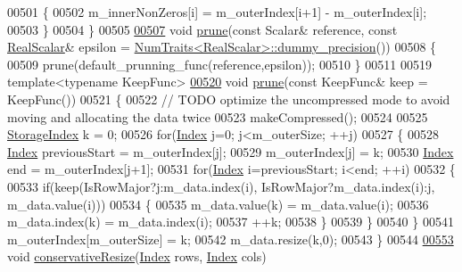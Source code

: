 \begin{DoxyCode}
00501       \{
00502         m\_innerNonZeros[i] = m\_outerIndex[i+1] - m\_outerIndex[i]; 
00503       \}
00504     \}
00505     
\hyperlink{group___sparse_core___module_a08af03b2fc6c371c8be4fcd62509288c}{00507}     \textcolor{keywordtype}{void} \hyperlink{group___sparse_core___module_a08af03b2fc6c371c8be4fcd62509288c}{prune}(\textcolor{keyword}{const} Scalar& reference, \textcolor{keyword}{const} \hyperlink{group___sparse_core___module_aaec8ace6efb785c81d442931c3248d88}{RealScalar}& epsilon = 
      \hyperlink{group___core___module_struct_eigen_1_1_num_traits}{NumTraits<RealScalar>::dummy\_precision}())
00508     \{
00509       prune(default\_prunning\_func(reference,epsilon));
00510     \}
00511     
00519     \textcolor{keyword}{template}<\textcolor{keyword}{typename} KeepFunc>
\hyperlink{group___sparse_core___module_a0e5f8cc59ee57207f0cff6b142bcdd0d}{00520}     \textcolor{keywordtype}{void} \hyperlink{group___sparse_core___module_a0e5f8cc59ee57207f0cff6b142bcdd0d}{prune}(\textcolor{keyword}{const} KeepFunc& keep = KeepFunc())
00521     \{
00522       \textcolor{comment}{// TODO optimize the uncompressed mode to avoid moving and allocating the data twice}
00523       makeCompressed();
00524 
00525       \hyperlink{group___sparse_core___module_a0b540ba724726ebe953f8c0df06081ed}{StorageIndex} k = 0;
00526       \textcolor{keywordflow}{for}(\hyperlink{group___core___module_a554f30542cc2316add4b1ea0a492ff02}{Index} j=0; j<m\_outerSize; ++j)
00527       \{
00528         \hyperlink{group___core___module_a554f30542cc2316add4b1ea0a492ff02}{Index} previousStart = m\_outerIndex[j];
00529         m\_outerIndex[j] = k;
00530         \hyperlink{group___core___module_a554f30542cc2316add4b1ea0a492ff02}{Index} end = m\_outerIndex[j+1];
00531         \textcolor{keywordflow}{for}(\hyperlink{group___core___module_a554f30542cc2316add4b1ea0a492ff02}{Index} i=previousStart; i<end; ++i)
00532         \{
00533           \textcolor{keywordflow}{if}(keep(IsRowMajor?j:m\_data.index(i), IsRowMajor?m\_data.index(i):j, m\_data.value(i)))
00534           \{
00535             m\_data.value(k) = m\_data.value(i);
00536             m\_data.index(k) = m\_data.index(i);
00537             ++k;
00538           \}
00539         \}
00540       \}
00541       m\_outerIndex[m\_outerSize] = k;
00542       m\_data.resize(k,0);
00543     \}
00544 
\hyperlink{group___sparse_core___module_a9dc538b2c1fe9027ba58f31ee83b2ff1}{00553}     \textcolor{keywordtype}{void} \hyperlink{group___sparse_core___module_a9dc538b2c1fe9027ba58f31ee83b2ff1}{conservativeResize}(\hyperlink{group___core___module_a554f30542cc2316add4b1ea0a492ff02}{Index} rows, \hyperlink{group___core___module_a554f30542cc2316add4b1ea0a492ff02}{Index} cols) 

\end{DoxyCode}
